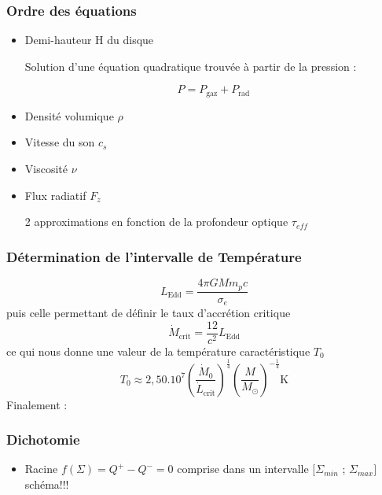 \documentclass[french]{beamer}
\begin{document}
\begin{frame}
\frametitle{Ordre des équations}
\begin{itemize}

\item Demi-hauteur H du disque

Solution d'une équation quadratique trouvée à partir de la pression :

\begin{equation}
P = P_\mathrm{gaz} + P_\mathrm{rad}
\end{equation}

\item Densité volumique $\rho$
\item Vitesse du son $c_s$ 
\item Viscosité $\nu$ 

\item Flux radiatif $F_z$

2 approximations en fonction de la profondeur optique $\tau_{eff}$
\end{itemize}
\end{frame}



\begin{frame}
\frametitle{Détermination de l'intervalle de Température} 
\begin{equation}
L_\mathrm{Edd} = \frac{4\pi GMm_pc}{\sigma_e}
\end{equation}
puis celle permettant de définir le taux d’accrétion critique 
\begin{equation}
\dot{M}_\mathrm{crit} = \frac{12}{c^2}L_\mathrm{Edd} 
\end{equation}
ce qui nous donne une valeur de la température caractéristique $T_0$
\begin{equation}
T_0 \approx 2,50.10^7\left(\frac{\dot{M}_0}{\dot{L}_\mathrm{crit}}\right)^{\frac{1}{4}}\left(\frac{M}{M_\odot}\right)^{-\frac{1}{4}} \mathrm{K}
\end{equation}
Finalement : %

\end{frame}


\begin{frame}

\frametitle{Dichotomie}
\begin{itemize}
\item Racine $f(\Sigma) = Q^+ - Q^- = 0$ comprise dans un intervalle $[\Sigma_{min}$ ; $\Sigma_{max}]$
\\
schéma!!!
\end{itemize}
\end{frame}
\end{document}
